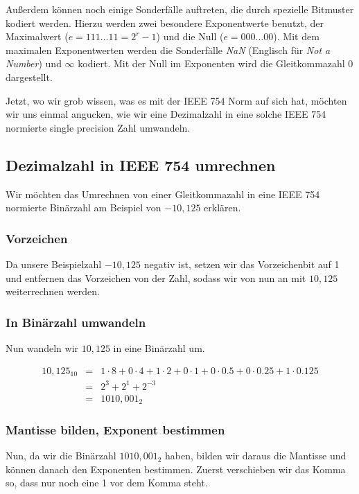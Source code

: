 Außerdem können noch einige Sonderfälle auftreten, die durch spezielle Bitmuster kodiert werden. Hierzu werden zwei besondere Exponentwerte benutzt, der Maximalwert ($e = 111\dots11 = 2^{r} - 1$) und die Null ($e = 000\dots00$). Mit dem maximalen Exponentwerten werden die Sonderfälle \textit{NaN} (Englisch für \textit{Not a Number}) und $\infty$ kodiert. Mit der Null im Exponenten wird die Gleitkommazahl 0 dargestellt.

Jetzt, wo wir grob wissen, was es mit der IEEE 754 Norm auf sich hat, möchten wir uns einmal angucken, wie wir eine Dezimalzahl in eine solche IEEE 754 normierte single precision Zahl umwandeln.


\subsection{Dezimalzahl in IEEE 754 umrechnen}

Wir möchten das Umrechnen von einer Gleitkommazahl in eine IEEE 754 normierte Binärzahl am Beispiel von $-10,125$ erklären.

\subsubsection{Vorzeichen}

Da unsere Beispielzahl $-10,125$ negativ ist, setzen wir das Vorzeichenbit auf 1 und entfernen das Vorzeichen von der Zahl, sodass wir von nun an mit $10,125$ weiterrechnen werden.

\subsubsection{In Binärzahl umwandeln}

Nun wandeln wir $10,125$ in eine Binärzahl um.

\begin{eqnarray}
10,125_{10} & = & 1 \cdot 8 + 0 \cdot 4 + 1 \cdot 2 + 0 \cdot 1 + 0 \cdot 0.5 + 0 \cdot 0.25 + 1 \cdot 0.125 \\
& = & 2^{3} + 2^{1} + 2^{-3} \\
& = & 1010,001_{2}
\end{eqnarray}

\subsubsection{Mantisse bilden, Exponent bestimmen}

Nun, da wir die Binärzahl $1010,001_{2}$ haben, bilden wir daraus die Mantisse und können danach den Exponenten bestimmen. Zuerst verschieben wir das Komma so, dass nur noch eine 1 vor dem Komma steht.

